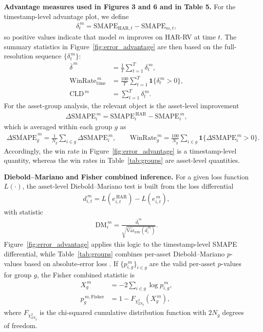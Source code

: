 \documentclass[a4paper]{article}
\begin{document}
\vspace{0.15cm}
\noindent \textbf{Advantage measures used in Figures 3 and 6 and in Table 5.}
For the timestamp-level advantage plot, we define
\begin{align*}
\delta_t^{\,m}
=
\mathrm{SMAPE}_{\mathrm{HAR},t}
-
\mathrm{SMAPE}_{m,t},
\end{align*}
so positive values indicate that model $m$ improves on HAR-RV at time $t$. The summary statistics in Figure~\ref{fig:error_advantage} are then based on the full-resolution sequence $\{\delta_t^{\,m}\}$:
\begin{align*}
\overline{\delta}^{\,m} &= \frac{1}{T}\sum_{t=1}^{T}\delta_t^{\,m},\\
\mathrm{WinRate}^{\,m}_{\mathrm{time}} &= \frac{100}{T}\sum_{t=1}^{T}\mathbf{1}\{\delta_t^{\,m}>0\},\\
\mathrm{CLD}^{\,m} &= \sum_{t=1}^{T}\delta_t^{\,m}.
\end{align*}
For the asset-group analysis, the relevant object is the asset-level improvement
\begin{align*}
\Delta \mathrm{SMAPE}^{\,m}_i
=
\mathrm{SMAPE}^{\,\mathrm{HAR}}_i
-
\mathrm{SMAPE}^{\,m}_i,
\end{align*}
which is averaged within each group $g$ as
\begin{align*}
\overline{\Delta \mathrm{SMAPE}}^{\,m}_g
=
\frac{1}{N_g}\sum_{i \in g}\Delta \mathrm{SMAPE}^{\,m}_i,
\qquad
\mathrm{WinRate}^{\,m}_g
=
\frac{100}{N_g}\sum_{i \in g}\mathbf{1}\{\Delta \mathrm{SMAPE}^{\,m}_i>0\}.
\end{align*}
Accordingly, the win rate in Figure~\ref{fig:error_advantage} is a timestamp-level quantity, whereas the win rates in Table~\ref{tab:groups} are asset-level quantities.

\vspace{0.15cm}
\noindent \textbf{Diebold--Mariano and Fisher combined inference.}
For a given loss function $L(\cdot)$, the asset-level Diebold--Mariano test is built from the loss differential
\begin{align*}
d^{\,m}_{i,t}
=
L\!\left(e^{\,\mathrm{HAR}}_{i,t}\right)
-
L\!\left(e^{\,m}_{i,t}\right),
\end{align*}
with statistic
\begin{align*}
\mathrm{DM}^{\,m}_i
=
\frac{\bar{d}^{\,m}_i}{\sqrt{\widehat{\mathrm{Var}}_{\mathrm{NW}}(\bar{d}^{\,m}_i)}}.
\end{align*}
Figure~\ref{fig:error_advantage} applies this logic to the timestamp-level SMAPE differential, while Table~\ref{tab:groups} combines per-asset Diebold--Mariano $p$-values based on absolute-error loss \cite{diebold1995}. If $\{p^{\,m}_{i,g}\}_{i \in g}$ are the valid per-asset $p$-values for group $g$, the Fisher combined statistic is
\begin{align*}
X^{\,m}_g &= -2\sum_{i \in g}\log p^{\,m}_{i,g},\\
p^{\,m,\mathrm{Fisher}}_g &= 1 - F_{\chi^2_{2N_g}}\!\left(X^{\,m}_g\right),
\end{align*}
where $F_{\chi^2_{2N_g}}$ is the chi-squared cumulative distribution function with $2N_g$ degrees of freedom.
\end{document}
